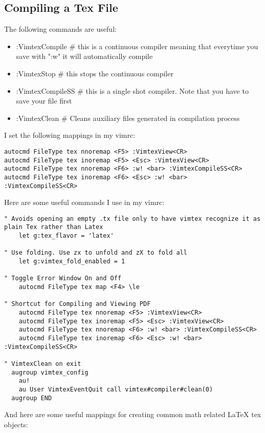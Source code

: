 \documentclass[10pt]{article}
\begin{document}
\subsection{Compiling a Tex File}
The following commands are useful:
\begin{itemize}
    \item :VimtexCompile \# this is a continuous compiler meaning that everytime
        you save with ":w" it will automatically compile
    \item :VimtexStop \# this stops the continuous compiler
    \item :VimtexCompileSS \# this is a single shot compiler. Note that you have
        to save your file first \item :VimtexClean \# Cleans auxiliary files
        generated in compilation process
\end{itemize}
I set the following mappings in my vimrc:
\begin{lstlisting}
autocmd FileType tex nnoremap <F5> :VimtexView<CR>
autocmd FileType tex inoremap <F5> <Esc> :VimtexView<CR>
autocmd FileType tex nnoremap <F6> :w! <bar> :VimtexCompileSS<CR>
autocmd FileType tex inoremap <F6> <Esc> :w! <bar> :VimtexCompileSS<CR>
\end{lstlisting}
Here are some useful commands I use in my vimrc:
\begin{lstlisting}
" Avoids opening an empty .tx file only to have vimtex recognize it as plain Tex rather than Latex
    let g:tex_flavor = 'latex'

" Use folding. Use zx to unfold and zX to fold all
    let g:vimtex_fold_enabled = 1

" Toggle Error Window On and Off
    autocmd FileType tex map <F4> \le

" Shortcut for Compiling and Viewing PDF
    autocmd FileType tex nnoremap <F5> :VimtexView<CR>
    autocmd FileType tex inoremap <F5> <Esc> :VimtexView<CR>
    autocmd FileType tex nnoremap <F6> :w! <bar> :VimtexCompileSS<CR>
    autocmd FileType tex inoremap <F6> <Esc> :w! <bar> :VimtexCompileSS<CR>

" VimtexClean on exit
  augroup vimtex_config
    au!
    au User VimtexEventQuit call vimtex#compiler#clean(0)
  augroup END
\end{lstlisting}
And here are some useful mappings for creating common math related LaTeX tex
objects:
\end{document}
